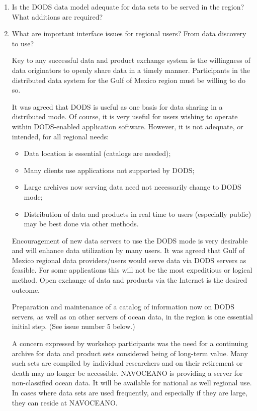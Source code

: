\begin{enumerate}
\item Is the DODS data model adequate for data sets to be served in the region? What additions are 
required?
\item What are important interface issues for regional users? From data discovery to use?

Key to any successful data and product exchange system is the willingness of data originators to 
openly share data in a timely manner. Participants in the distributed data system for the Gulf of 
Mexico region must be willing to do so.

It was agreed that DODS is useful as one basis for data sharing in a distributed mode. Of course, 
it is very useful for users wishing to operate within DODS-enabled application software. 
However, it is not adequate, or intended, for all regional needs:
\begin{itemize}
  \item   Data location is essential (catalogs are needed);
  \item   Many clients use applications not supported by DODS;
  \item   Large archives now serving data need not necessarily change to DODS mode;
  \item   Distribution of data and products in real time to users (especially public) may be best done 
via other methods.
\end{itemize}

Encouragement of new data servers to use the DODS mode is very desirable and will enhance 
data utilization by many users. It was agreed that Gulf of Mexico regional data providers/users 
would serve data via DODS servers as feasible. For some applications this will not be the most 
expeditious or logical method. Open exchange of data and products via the Internet is the desired 
outcome. 

Preparation and maintenance of a catalog of information now on DODS servers, as well as on 
other servers of ocean data, in the region is one essential initial step. (See issue number 5 below.)

A concern expressed by workshop participants was the need for a continuing archive for data 
and product sets considered being of long-term value. Many such sets are compiled by individual 
researchers and on their retirement or death may no longer be accessible. NAVOCEANO is 
providing a server for non-classified ocean data. It will be available for national as well regional 
use. In cases where data sets are used frequently, and especially if they are large, they can reside 
at NAVOCEANO. 


\end{enumerate}
